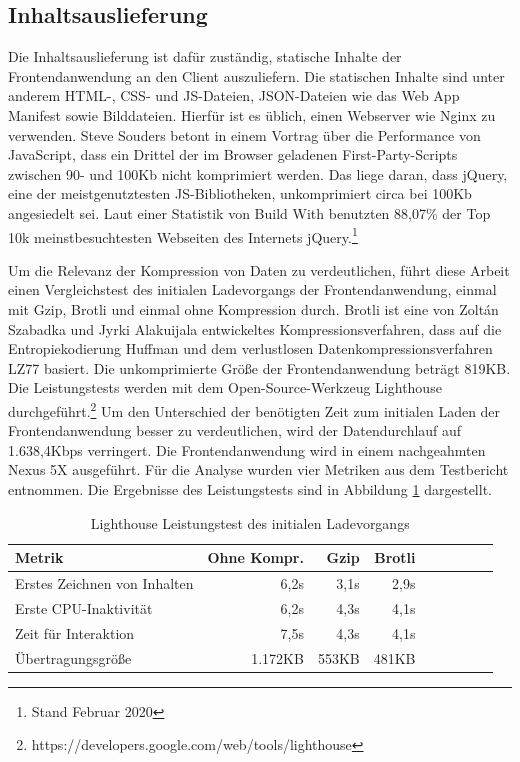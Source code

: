\subsection{Inhaltsauslieferung}
\label{subsec:inhaltsauslieferung}
Die Inhaltsauslieferung ist dafür zuständig, statische Inhalte der Frontendanwendung
an den Client auszuliefern. Die statischen Inhalte sind unter anderem
HTML-, CSS- und JS-Dateien, JSON-Dateien wie das Web App Manifest sowie Bilddateien.
Hierfür ist es üblich, einen Webserver wie Nginx zu verwenden. Steve Souders betont
in einem Vortrag über die Performance von JavaScript, dass ein Drittel der im Browser
geladenen First-Party-Scripts zwischen 90- und 100Kb nicht komprimiert werden.
Das liege daran, dass jQuery, eine der meistgenutztesten JS-Bibliotheken,
unkomprimiert circa bei 100Kb angesiedelt sei.\cite{SteveSoudersMakeJavaScriptFaster}
Laut einer Statistik von Build With benutzten 88,07\% der Top 10k meinstbesuchtesten
Webseiten des Internets jQuery.\footnote{Stand Februar 2020}\cite{BuildWithjQuery}

Um die Relevanz der Kompression von Daten zu verdeutlichen, führt diese Arbeit einen
Vergleichstest des initialen Ladevorgangs der Frontendanwendung,
einmal mit Gzip, Brotli und einmal ohne Kompression durch. Brotli ist eine
von Zoltán Szabadka und Jyrki Alakuijala entwickeltes Kompressionsverfahren,
dass auf die Entropiekodierung Huffman und dem verlustlosen
Datenkompressionsverfahren LZ77 basiert.\cite{BrotliGoogleOpenSourceBlog}
Die unkomprimierte Größe der Frontendanwendung beträgt 819KB. Die Leistungstests
werden mit dem Open-Source-Werkzeug Lighthouse durchgeführt.\footnote{https://developers.google.com/web/tools/lighthouse}
Um den Unterschied der benötigten Zeit zum initialen Laden der Frontendanwendung
besser zu verdeutlichen, wird der Datendurchlauf auf 1.638,4Kbps verringert.
Die Frontendanwendung wird in einem nachgeahmten Nexus 5X ausgeführt.
Für die Analyse wurden vier Metriken aus dem Testbericht entnommen.
Die Ergebnisse des Leistungstests sind in Abbildung \ref{tab:lighthouseleistungstestdesinitialenladevorgangs}
dargestellt.

\begin{table}[h]
    \begin{center}
\begin{tabular}{l*{8}{r}}
Metrik & Ohne Kompr. & Gzip & Brotli \\
\hline
Erstes Zeichnen von Inhalten & 6,2s  & 3,1s & 2,9s \\
Erste CPU-Inaktivität        & 6,2s  & 4,3s & 4,1s \\
Zeit für Interaktion         & 7,5s  & 4,3s & 4,1s \\
Übertragungsgröße            & 1.172KB  &  553KB & 481KB \\
\end{tabular}
\end{center}
\caption{Lighthouse Leistungstest des initialen Ladevorgangs}
\label{tab:lighthouseleistungstestdesinitialenladevorgangs}
\end{table}

